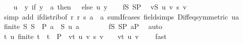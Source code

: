\begin{isabellebody}
\ \ \isamarkupfalse%
\ {\isacharquery}{\kern0pt}u\ {\isacharequal}{\kern0pt}\ {\isachardoublequoteopen}{\isasymlambda}y{\isachardot}{\kern0pt}\ if\ y\ {\isacharequal}{\kern0pt}\ a\ then\ {\isacharminus}{\kern0pt}\ {}\ else\ u\ y{\isachardoublequoteclose}\isanewline
\ \ \isamarkupfalse%
\ fS\ SP\ \isamarkupfalse%
\ {\isachardoublequoteopen}{\isacharparenleft}{\kern0pt}{\isasymSum}v{\isasymin}{\isacharquery}{\kern0pt}S{\isachardot}{\kern0pt}\ {\isacharquery}{\kern0pt}u\ v\ {\isacharasterisk}{\kern0pt}s\ v{\isacharparenright}{\kern0pt}\ {\isacharequal}{\kern0pt}\ {}{\isachardoublequoteclose}\isanewline
\ \ \ \ \isamarkupfalse%
\ {\isacharparenleft}{\kern0pt}simp\ add{\isacharcolon}{\kern0pt}\ if{\isacharunderscore}{\kern0pt}distrib{\isacharbrackleft}{\kern0pt}of\ {\isachardoublequoteopen}{\isasymlambda}r{\isachardot}{\kern0pt}\ r\ {\isacharasterisk}{\kern0pt}s\ a{\isachardoublequoteclose}\ \ a{\isacharbrackright}{\kern0pt}\ sum{\isachardot}{\kern0pt}If{\isacharunderscore}{\kern0pt}cases\ field{\isacharunderscore}{\kern0pt}simps\ Diff{\isacharunderscore}{\kern0pt}eq{\isacharbrackleft}{\kern0pt}symmetric{\isacharbrackright}{\kern0pt}\ ua{\isacharparenright}{\kern0pt}\isanewline
\ \ \isamarkupfalse%
\ \isamarkupfalse%
\ {\isachardoublequoteopen}finite\ {\isacharquery}{\kern0pt}S{\isachardoublequoteclose}\ {\isachardoublequoteopen}{\isacharquery}{\kern0pt}S\ {\isasymsubseteq}\ P{\isachardoublequoteclose}\ {\isachardoublequoteopen}a\ {\isasymin}\ {\isacharquery}{\kern0pt}S{\isachardoublequoteclose}\ {\isachardoublequoteopen}{\isacharquery}{\kern0pt}u\ a\ {\isasymnoteq}\ {}{\isachardoublequoteclose}\isanewline
\ \ \ \ \isamarkupfalse%
\ fS\ SP\ aP\ \isamarkupfalse%
\ auto\isanewline
\ \ \isamarkupfalse%
\ \isamarkupfalse%
\ {\isachardoublequoteopen}{\isasymexists}t\ u{\isachardot}{\kern0pt}\ finite\ t\ {\isasymand}\ t\ {\isasymsubseteq}\ P\ {\isasymand}\ {\isacharparenleft}{\kern0pt}{\isasymSum}v{\isasymin}t{\isachardot}{\kern0pt}\ u\ v\ {\isacharasterisk}{\kern0pt}s\ v{\isacharparenright}{\kern0pt}\ {\isacharequal}{\kern0pt}\ {}\ {\isasymand}\ {\isacharparenleft}{\kern0pt}{\isasymexists}v{\isasymin}t{\isachardot}{\kern0pt}\ u\ v\ {\isasymnoteq}\ {}{\isacharparenright}{\kern0pt}{\isachardoublequoteclose}\ \isamarkupfalse%
\ fast\isanewline
{}\isamarkupfalse%
\isanewline
\ \ \isamarkupfalse%

\end{isabellebody}
